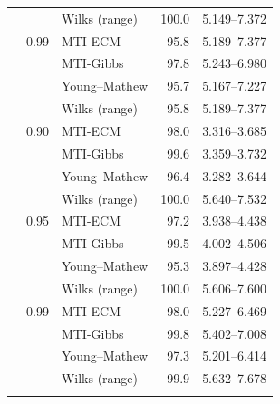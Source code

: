 \begin{longtable}{@{}rrlrr@{}}
 &  & Wilks (range) & 100.0 & 5.149--7.372 \\
\addlinespace[0.3em]
500 & 0.99 & MTI-ECM & 95.8 & 5.189--7.377 \\
 &  & MTI-Gibbs & 97.8 & 5.243--6.980 \\
 &  & Young--Mathew & 95.7 & 5.167--7.227 \\
 &  & Wilks (range) & 95.8 & 5.189--7.377 \\
\addlinespace[0.3em]
1000 & 0.90 & MTI-ECM & 98.0 & 3.316--3.685 \\
 &  & MTI-Gibbs & 99.6 & 3.359--3.732 \\
 &  & Young--Mathew & 96.4 & 3.282--3.644 \\
 &  & Wilks (range) & 100.0 & 5.640--7.532 \\
\addlinespace[0.3em]
1000 & 0.95 & MTI-ECM & 97.2 & 3.938--4.438 \\
 &  & MTI-Gibbs & 99.5 & 4.002--4.506 \\
 &  & Young--Mathew & 95.3 & 3.897--4.428 \\
 &  & Wilks (range) & 100.0 & 5.606--7.600 \\
\addlinespace[0.3em]
1000 & 0.99 & MTI-ECM & 98.0 & 5.227--6.469 \\
 &  & MTI-Gibbs & 99.8 & 5.402--7.008 \\
 &  & Young--Mathew & 97.3 & 5.201--6.414 \\
 &  & Wilks (range) & 99.9 & 5.632--7.678 \\
\addlinespace[0.3em]
\end{longtable}
\clearpage
